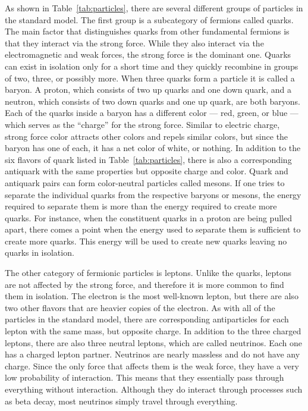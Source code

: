 As shown in Table~\ref{tab:particles}, there are several different groups of particles in the standard model. The first group is a subcategory of fermions called quarks. The main factor that distinguishes quarks from other fundamental fermions is that they interact via the strong force. While they also interact via the electromagnetic and weak forces, the strong force is the dominant one. Quarks can exist in isolation only for a short time and they quickly recombine in groups of two, three, or possibly more. When three quarks form a particle it is called a baryon. A proton, which consists of two up quarks and one down quark, and a neutron, which consists of two down quarks and one up quark, are both baryons. Each of the quarks inside a baryon has a different color --- red, green, or blue --- which serves as the ``charge'' for the strong force. Similar to electric charge, strong force color attracts other colors and repels similar colors, but since the baryon has one of each, it has a net color of white, or nothing. In addition to the six flavors of quark listed in Table~\ref{tab:particles}, there is also a corresponding antiquark with the same properties but opposite charge and color. Quark and antiquark pairs can form color-neutral particles called mesons. If one tries to separate the individual quarks from the respective baryons or mesons, the energy required to separate them is more than the energy required to create more quarks. For instance, when the constituent quarks in a proton are being pulled apart, there comes a point when the energy used to separate them is sufficient to create more quarks. This energy will be used to create new quarks leaving no quarks in isolation.

The other category of fermionic particles is leptons. Unlike the quarks, leptons are not affected by the strong force, and therefore it is more common to find them in isolation. The electron is the most well-known lepton, but there are also two other flavors that are heavier copies of the electron. As with all of the particles in the standard model, there are corresponding antiparticles for each lepton with the same mass, but opposite charge. In addition to the three charged leptons, there are also three neutral leptons, which are called neutrinos. Each one has a charged lepton partner. Neutrinos are nearly massless and do not have any charge. Since the only force that affects them is the weak force, they have a very low probability of interaction. This means that they essentially pass through everything without interaction. Although they do interact through processes such as beta decay, most neutrinos simply travel through everything. 

